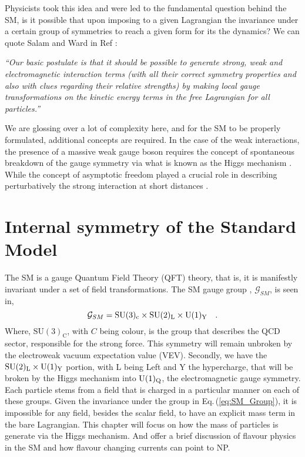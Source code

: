 Physicists took this idea and were led to the fundamental question behind the SM, is it possible that upon imposing to a given Lagrangian the invariance under a certain group of symmetries to reach a given form for its the dynamics? 
%
%
We can quote Salam and Ward in Ref \cite{Gr_newald_2008}: %

\textit{“Our basic postulate is that it should be possible to generate strong,  weak and electromagnetic  interaction terms (with all their correct symmetry properties and also with clues regarding their relative strengths) by making local gauge transformations on the kinetic energy terms in the free Lagrangian for all particles.”}

We are glossing over a lot of complexity here, and for the SM to be properly formulated, additional concepts are required. In the case of the weak interactions, the presence of a massive weak gauge boson requires the concept of spontaneous breakdown of the gauge symmetry via what is known as the Higgs mechanism \cite{higgs1964broken,englert1964broken,guralnik1964global}. 
%
While the concept of asymptotic freedom played a crucial role in describing perturbatively the strong interaction at short distances \cite{politzer1973reliable,gross1973ultraviolet}.  

\renewcommand{\cleardoublepage}{}
\renewcommand{\clearpage}{}

\section{Internal symmetry of the Standard Model}
%
The SM is a gauge Quantum Field Theory (QFT) theory, that is, it is manifestly invariant under a set of field transformations. The SM gauge group \cite{Quigg:1983gw}, $\mathcal{G}_{SM}$, is seen in, 
%
\begin{equation}
\mathcal{G}_{SM} = \mathrm{SU}(3)_{\mathrm{c}} \times \mathrm{SU}(2)_{\mathrm{L}} \times \mathrm{U}(1)_{\mathrm{Y}} \quad  .
\label{eq:SM_Group}
\end{equation} 
%
Where, $\mathrm{SU}(3)_{\mathrm{C}}$, with $C$ being colour, is the group that describes the QCD sector, responsible for the strong force. This symmetry will remain unbroken by the electroweak vacuum expectation value (VEV). Secondly, we have the $\mathrm{SU}(2)_{\mathrm{L}} \times \mathrm{U}(1)_{\mathrm{Y}}$ portion, with L being Left and Y the hypercharge, that will be broken by the Higgs mechanism into $\mathrm{U}(1)_{\mathrm{Q}}$, the electromagnetic gauge symmetry.
%
Each particle stems from a field that is charged in a particular manner on each of these groups.
%
Given the invariance under the group in Eq.\,(\ref{eq:SM_Group}), it is impossible for any field, besides the scalar field, to have an explicit mass term in the bare Lagrangian. 
%
This chapter will focus on how the mass of particles is generate via the Higgs mechanism.
%
And offer a brief discussion of flavour physics in the SM and how flavour changing currents can point to NP. 

